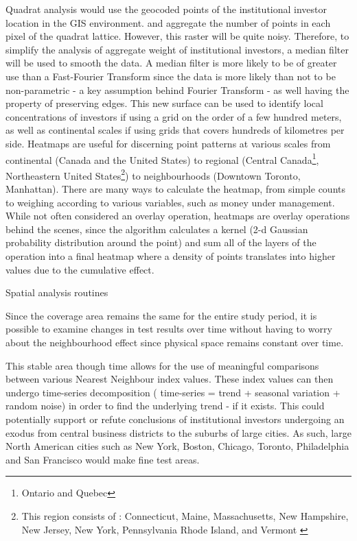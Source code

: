 \documentclass[12pt,letterpaper,notitlepage,onecolumn,final,openbib]{article}
\begin{document}
	Quadrat analysis would use the geocoded points of the institutional investor location in the GIS environment. and aggregate the number of points in each pixel of the quadrat lattice.  However, this raster will be quite noisy.  Therefore, to simplify the analysis of aggregate weight of institutional investors, a median filter will be used to smooth the data.  A median filter is more likely to be of greater use than a Fast-Fourier Transform since the data is more likely than not to be non-parametric - a key assumption behind Fourier Transform - as well having the property of preserving edges.  This new surface can be used to identify local concentrations of investors if using a grid on the order of a few hundred meters, as well as continental scales if using grids that covers hundreds of kilometres per side.   
	Heatmaps are useful for discerning point patterns at various scales from continental (Canada and the United States) to regional (Central Canada\footnote{Ontario and Quebec}, Northeastern United States\footnote{This region consists of : Connecticut, Maine, Massachusetts, New Hampshire, New Jersey, New York, Pennsylvania Rhode Island, and Vermont \cite{Census2010_div}}) to neighbourhoods (Downtown Toronto, Manhattan).  There are many ways to calculate the heatmap, from simple counts to weighing according to various variables, such as money under management.   While not often considered an overlay operation, heatmaps are overlay operations behind the scenes, since the algorithm calculates a kernel (2-d Gaussian probability distribution around the point) and sum all of the layers of the operation into a final heatmap where a density of points translates into higher values due to the cumulative effect.  
	
	Spatial analysis routines 
	
	Since the coverage area remains the same for the entire study period, it is possible to examine changes in test results over time without having to worry about the neighbourhood effect since physical space remains constant over time.  
	
	This stable area though time allows for the use of meaningful comparisons between various Nearest Neighbour index values. These index values can then undergo time-series decomposition ( time-series = trend + seasonal variation + random noise) in order to find the underlying trend - if it exists.  This could potentially support or refute  conclusions of institutional investors undergoing an exodus from central business districts to the suburbs of large cities.  As such, large North American cities such as New York, Boston, Chicago, Toronto, Philadelphia and San Francisco would make fine test areas.   
	
\end{document}
